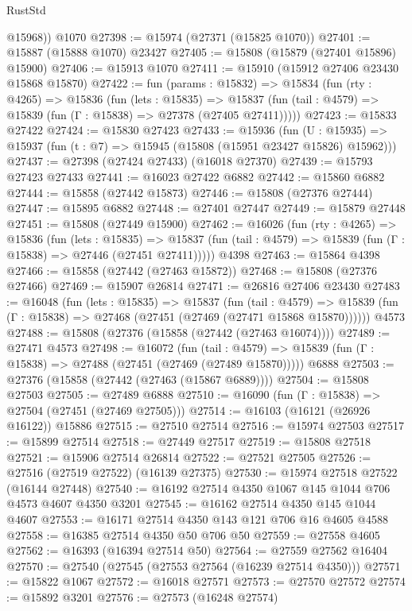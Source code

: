 \begin{lexlean}{RustStd}
\begin{coremodule}
        @15968))
    @1070
@27398 := @15974 (@27371 (@15825 @1070))
@27401 := @15887 (@15888 @1070) @23427
@27405 := @15808 (@15879 (@27401 @15896) @15900)
@27406 := @15913 @1070
@27411 := @15910 (@15912 @27406 @23430 @15868 @15870)
@27422 := fun (params : @15832) =>
  @15834
    (fun (rty : @4265) =>
    @15836
      (fun (lets : @15835) =>
      @15837 (fun (tail : @4579) => @15839 (fun (Γ : @15838) => @27378 (@27405 @27411)))))
@27423 := @15833 @27422
@27424 := @15830 @27423
@27433 := @15936
    (fun (U : @15935) => @15937 (fun (t : @7) => @15945 (@15808 (@15951 @23427 @15826) @15962)))
@27437 := @27398 (@27424 @27433) (@16018 @27370)
@27439 := @15793 @27423 @27433
@27441 := @16023 @27422 @6882
@27442 := @15860 @6882
@27444 := @15858 (@27442 @15873)
@27446 := @15808 (@27376 @27444)
@27447 := @15895 @6882
@27448 := @27401 @27447
@27449 := @15879 @27448
@27451 := @15808 (@27449 @15900)
@27462 := @16026
    (fun (rty : @4265) =>
    @15836
      (fun (lets : @15835) =>
      @15837 (fun (tail : @4579) => @15839 (fun (Γ : @15838) => @27446 (@27451 @27411)))))
    @4398
@27463 := @15864 @4398
@27466 := @15858 (@27442 (@27463 @15872))
@27468 := @15808 (@27376 @27466)
@27469 := @15907 @26814
@27471 := @26816 @27406 @23430
@27483 := @16048
    (fun (lets : @15835) =>
    @15837
      (fun (tail : @4579) =>
      @15839 (fun (Γ : @15838) => @27468 (@27451 (@27469 (@27471 @15868 @15870))))))
    @4573
@27488 := @15808 (@27376 (@15858 (@27442 (@27463 @16074))))
@27489 := @27471 @4573
@27498 := @16072
    (fun (tail : @4579) => @15839 (fun (Γ : @15838) => @27488 (@27451 (@27469 (@27489 @15870)))))
    @6888
@27503 := @27376 (@15858 (@27442 (@27463 (@15867 @6889))))
@27504 := @15808 @27503
@27505 := @27489 @6888
@27510 := @16090 (fun (Γ : @15838) => @27504 (@27451 (@27469 @27505)))
@27514 := @16103 (@16121 (@26926 @16122)) @15886
@27515 := @27510 @27514
@27516 := @15974 @27503
@27517 := @15899 @27514
@27518 := @27449 @27517
@27519 := @15808 @27518
@27521 := @15906 @27514 @26814
@27522 := @27521 @27505
@27526 := @27516 (@27519 @27522) (@16139 @27375)
@27530 := @15974 @27518 @27522 (@16144 @27448)
@27540 := @16192 @27514 @4350 @1067 @145 @1044 @706 @4573 @4607 @4350 @3201
@27545 := @16162 @27514 @4350 @145 @1044 @4607
@27553 := @16171 @27514 @4350 @143 @121 @706 @16 @4605 @4588
@27558 := @16385 @27514 @4350 @50 @706 @50
@27559 := @27558 @4605
@27562 := @16393 (@16394 @27514 @50)
@27564 := @27559 @27562 @16404
@27570 := @27540 (@27545 (@27553 @27564 (@16239 @27514 @4350)))
@27571 := @15822 @1067
@27572 := @16018 @27571
@27573 := @27570 @27572
@27574 := @15892 @3201
@27576 := @27573 (@16248 @27574)

\end{coremodule}
\end{lexlean}
